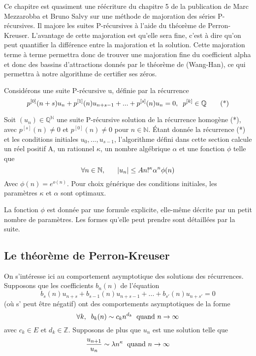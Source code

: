 \documentclass[a4paper,10.5pt]{article}
\begin{document}
	Ce chapitre est quasiment une réécriture du chapitre 5 de la publication de Marc Mezzarobba et Bruno Salvy \cite{MezzarobbaSalvy2010} sur une méthode de majoration des séries P-récursives. Il majore les suites P-récursives à l'aide du théorème de Perron-Kreuser.
	L'avantage de cette majoration est qu'elle sera fine, c'est à dire qu'on peut quantifier la différence entre la majoration et la solution.
	Cette majoration terme à terme permettra donc de trouver une majoration fine du coefficient alpha et donc des bassins d'attractions donnés par le théorème de (Wang-Han), ce qui permettra à notre algorithme de certifier ses zéros.
	
	Considérons une suite P-récursive u, définie par la récurrence
	\[p^{[0]}(n+s)u_{n}+p^{[1]}(n)u_{n+s-1}+...+p^{[s]}(n)u_{n}=0,\hspace{2mm} p^{[k]}\in \mathbb{Q} \tag{*}\] 
	\begin{theorem}Soit $(u_{n})\in \mathbb{Q}^{\mathbb{N}}$ une suite P-récursive solution de la récurrence homogène (*), avec $p^{[s]}(n) \neq 0$ et $p^{[0]}(n) \neq 0$ pour $n \in \mathbb{N}$. Étant donnée la récurrence (*) et les conditions initiales $u_{0},...,u_{s-1}$, l'algorithme défini dans cette section calcule un réel positif A, un rationnel $\kappa$, un nombre algébrique $\alpha$  et une fonction $\phi$ telle que
		\[\forall n\in \mathbb{N}, \hspace{6mm}|u_{n}| \leq A n!^{\kappa}\alpha^{n}\phi(n)\]
		Avec $\phi(n)=e^{o(n)}$. Pour choix générique des conditions initiales, les paramètres $\kappa$ et $\alpha$ sont optimaux.
	\end{theorem}
	
	La fonction $\phi$ est donnée par une formule explicite, elle-même décrite par un petit nombre de paramètres. Les formes qu'elle peut prendre sont détaillées par la suite.
	
	\subsection{Le théorème de Perron-Kreuser}
	
	On s'intéresse ici au comportement asymptotique des solutions des récurrences. Supposons que les coefficients $b_{n}(n)$ de l'équation
	\[b_{s}(n)u_{n+s}+b_{s-1}(n)u_{n+s-1}+...+b_{s'}(n)u_{n+s'}=0  \tag{*}\]
	(où s' peut être négatif) ont des comportements asymptotiques de la forme
	\[\forall k, \hspace{2mm} b_{k}(n) \sim c_{k}n^{d_{k}} \hspace{2mm} \text{quand } n \rightarrow \infty\]
	avec $c_{k} \in E$ et $d_{k} \in \mathbb{Z}$. Supposons de plus que $u_{n}$ est une solution telle que  
	\[\frac{u_{n+1}}{u_{n}}\sim \lambda n^{\kappa} \hspace{2mm} \text{quand }n \rightarrow \infty\]
	
\end{document}
